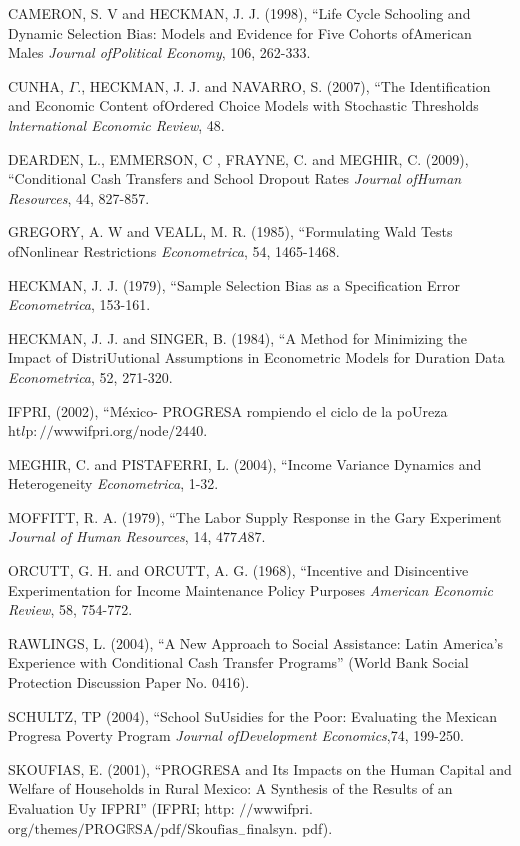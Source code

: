 CAMERON, S. V and HECKMAN, J. J. (1998), ``Life Cycle Schooling and Dynamic Selection Bias: Models and Evidence for Five Cohorts ofAmerican Males {\it Journal ofPolitical Economy}, 106, 262-333.

CUNHA, $\Gamma.$, HECKMAN, J. J. and NAVARRO, S. (2007), ``The Identification and Economic Content ofOrdered Choice Models with Stochastic Thresholds {\it lnternational Economic Review}, 48.

DEARDEN, L., EMMERSON, $\mathrm{C}$ , FRAYNE, C. and MEGHIR, C. (2009), ``Conditional Cash Transfers and School Dropout Rates {\it Journal ofHuman Resources}, 44, 827-857.

GREGORY, A. $\mathrm{W}$ and VEALL, M. R. (1985), ``Formulating Wald Tests ofNonlinear Restrictions {\it Econometrica}, 54, 1465-1468.

HECKMAN, J. J. (1979), ``Sample Selection Bias as a Specification Error {\it Econometrica}, 153-161.

HECKMAN, J. J. and SINGER, B. (1984), ``A Method for Minimizing the Impact of DistriUutional Assumptions in Econometric Models for Duration Data {\it Econometrica}, 52, 271-320.

IFPRI, (2002), ``M\'{e}xico- PROGRESA rompiendo el ciclo de la poUreza $\mathrm{h}\mathrm{t}l\mathrm{p}://\mathrm{w}\mathrm{w}\mathrm{w}\mathrm{i}$fpri.$\mathrm{o}\mathrm{r}\mathrm{g}/\mathrm{n}\mathrm{o}\mathrm{d}\mathrm{e}/2440.$

MEGHIR, C. and PISTAFERRI, L. (2004), ``Income Variance Dynamics and Heterogeneity {\it Econometrica}, 1-32.

MOFFITT, R. A. (1979), ``The Labor Supply Response in the Gary Experiment {\it Journal of Human Resources}, 14, $477A87.$

ORCUTT, G. H. and ORCUTT, A. G. (1968), ``Incentive and Disincentive Experimentation for Income Maintenance Policy Purposes {\it American Economic Review}, 58, 754-772.

RAWLINGS, L. (2004), ``A New Approach to Social Assistance: Latin America's Experience with Conditional Cash Transfer Programs'' (World Bank Social Protection Discussion Paper No. 0416).

SCHULTZ, $\mathrm{T} \mathrm{P}$ (2004), ``School SuUsidies for the Poor: Evaluating the Mexican Progresa Poverty Program {\it Journal ofDevelopment Economics},74, 199-250.

SKOUFIAS, E. (2001), ``PROGRESA and Its Impacts on the Human Capital and Welfare of Households in Rural Mexico: A Synthesis of the Results of an Evaluation Uy IFPRI'' (IFPRI; http: $//\mathrm{w}\mathrm{w}\mathrm{w}\mathrm{i}$fpri.$\mathrm{o}\mathrm{r}\mathrm{g}/\mathrm{t}\mathrm{h}\mathrm{e}\mathrm{m}\mathrm{e}\mathrm{s}/\mathrm{P}\mathrm{R}\mathrm{O}\mathrm{G}\mathbb{R}\mathrm{S}\mathrm{A}/ \mathrm{p}\mathrm{d}\mathrm{f}/\mathrm{S}\mathrm{k}\mathrm{o}\mathrm{u}\mathrm{f}\mathrm{i}\mathrm{a}\mathrm{s}_{-}$finalsyn. pdf).


